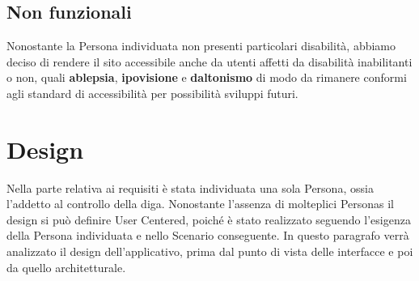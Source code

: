 \documentclass[a4paper,12pt]{report}
\begin{document}
\section{Non funzionali}
Nonostante la Persona individuata non presenti particolari disabilità, abbiamo deciso di rendere il sito accessibile anche da utenti affetti da disabilità inabilitanti o non, quali \textbf{ablepsia}, \textbf{ipovisione} e \textbf{daltonismo} di modo da rimanere conformi agli standard di accessibilità per possibilità sviluppi futuri.

\clearpage
\chapter{Design}\label{sec:design}
Nella parte relativa ai requisiti è stata individuata una sola Persona, ossia l'addetto al controllo della diga. Nonostante l'assenza di molteplici Personas il design si può definire User Centered, poiché è stato realizzato seguendo l'esigenza della Persona individuata e nello Scenario conseguente. In questo paragrafo verrà analizzato il design dell'applicativo, prima dal punto di vista delle interfacce e poi da quello architetturale.
\end{document}
